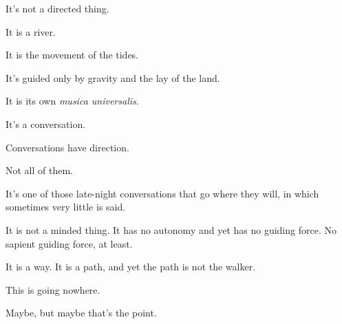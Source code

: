 \begin{paracol}{2}
\begin{leftcolumn}
It's not a directed thing.

It is a river.

It is the movement of the tides.

It's guided only by gravity and the lay of the land.

It is its own \emph{musica universalis}.

It's a conversation.

\begin{ally}
Conversations have direction.
\end{ally}
Not all of them.

It's one of those late-night conversations that go where they will, in which sometimes very little is said.

It is not a minded thing. It has no autonomy and yet has no guiding force. No sapient guiding force, at least.

It is a way. It is a path, and yet the path is not the walker.

\begin{ally}
This is going nowhere.
\end{ally}
Maybe, but maybe that's the point.
\newpage

\end{leftcolumn}
\end{paracol}

